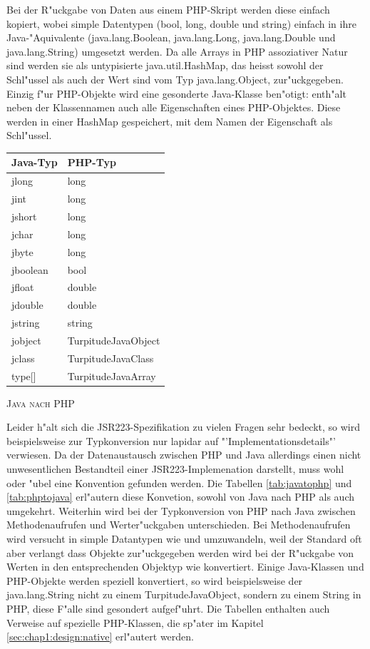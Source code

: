 Bei der R"uckgabe von Daten aus einem PHP-Skript werden diese einfach kopiert, wobei simple Datentypen (bool, long, double und string)
einfach in ihre Java-"Aquivalente (java.lang.Boolean, java.lang.Long, java.lang.Double und java.lang.String) umgesetzt werden.
Da alle Arrays in PHP assoziativer Natur sind werden sie als untypisierte java.util.HashMap, das heisst sowohl der Schl"ussel als auch der Wert
sind vom Typ java.lang.Object, zur"uckgegeben. Einzig f"ur PHP-Objekte wird eine gesonderte Java-Klasse ben"otigt:  enth"alt neben
der Klassennamen auch alle Eigenschaften eines PHP-Objektes. Diese werden in einer HashMap gespeichert, mit dem Namen der Eigenschaft
als Schl"ussel.
\begin{floatingtable}{
\label{tab:javatophp}
\begin{tabular}{|l|l|}
\hline
Java-Typ & PHP-Typ\\
\hline\hline
jlong & long\\
jint & long\\
jshort & long\\
jchar & long\\
jbyte & long\\
jboolean & bool\\
jfloat & double\\
jdouble & double\\
jstring & string\\
jobject & TurpitudeJavaObject\\
jclass & TurpitudeJavaClass\\
type[] & TurpitudeJavaArray\\
\hline
\end{tabular}}
\caption{\textsc{Java nach PHP}}
\end{floatingtable}
Leider h"alt sich die JSR223-Spezifikation zu vielen Fragen sehr bedeckt, so wird beispielsweise zur Typkonversion nur lapidar auf 
"'Implementationsdetails"' verwiesen. Da der Datenaustausch zwischen PHP und Java allerdings einen nicht unwesentlichen Bestandteil
einer JSR223-Implemenation darstellt, muss wohl oder "ubel eine Konvention gefunden werden. Die Tabellen \ref{tab:javatophp} und \ref{tab:phptojava}
erl"autern diese Konvetion, sowohl von Java nach PHP als auch umgekehrt. Weiterhin wird bei der Typkonversion von PHP nach Java zwischen 
Methodenaufrufen und Werter"uckgaben unterschieden. Bei Methodenaufrufen wird versucht in simple Datantypen wie  und 
umzuwandeln, weil der Standard oft aber verlangt dass Objekte zur"uckgegeben werden wird bei der R"uckgabe von Werten in den entsprechenden
Objektyp wie  konvertiert. Einige Java-Klassen und PHP-Objekte werden speziell konvertiert, so wird beispielsweise
der java.lang.String nicht zu einem TurpitudeJavaObject, sondern zu einem String in PHP, diese F"alle sind gesondert aufgef"uhrt. Die
Tabellen enthalten auch Verweise auf spezielle PHP-Klassen, die sp"ater im Kapitel \ref{sec:chap1:design:native} erl"autert werden.

